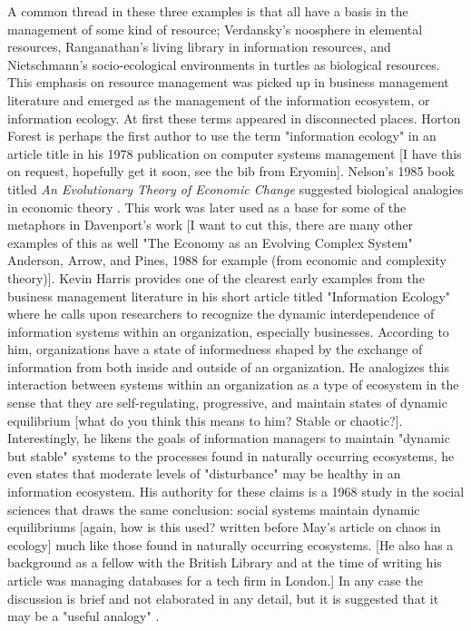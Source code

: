A common thread in these three examples is that all have a basis in the management of some kind of resource; Verdansky's noosphere in elemental resources, Ranganathan's living library in information resources, and Nietschmann's socio-ecological environments in turtles as biological resources. This emphasis on resource management was picked up in business management literature and emerged as the management of the information ecosystem, or information ecology. At first these terms appeared in disconnected places. Horton Forest is perhaps the first author to use the term "information ecology" in an article title in his 1978 publication on computer systems management \citep{forest_1978} [I have this on request, hopefully get it soon, see the bib from Eryomin]. Nelson's 1985 book titled \textit{An Evolutionary Theory of Economic Change} suggested biological analogies in economic theory \citep{nelson_evolutionary_1985}. This work was later used as a base for some of the metaphors in Davenport's work [I want to cut this, there are many other examples of this as well "The Economy as an Evolving Complex System" Anderson, Arrow, and Pines, 1988 for example (from economic and complexity theory)]. Kevin Harris provides one of the clearest early examples from the business management literature in his short article titled "Information Ecology" where he calls upon researchers to recognize the dynamic interdependence of information systems within an organization, especially businesses. According to him, organizations have a state of informedness shaped by the exchange of information from both inside and outside of an organization. He analogizes this interaction between systems within an organization as a type of ecosystem in the sense that they are self-regulating, progressive, and maintain states of dynamic equilibrium [what do you think this means to him? Stable or chaotic?]. Interestingly, he likens the goals of information managers to maintain "dynamic but stable" systems to the processes found in naturally occurring ecosystems, he even states that moderate levels of "disturbance" may be healthy in an information ecosystem. His authority for these claims is a 1968 study in the social sciences that draws the same conclusion: social systems maintain dynamic equilibriums [again, how is this used? written before May's article on chaos in ecology] much like those found in naturally occurring ecosystems. [He also has a background as a fellow with the British Library and at the time of writing his article was managing databases for a tech firm in London.] In any case the discussion is brief and not elaborated in any detail, but it is suggested that it may be a "useful analogy" \citep{harris_information_1989}.

